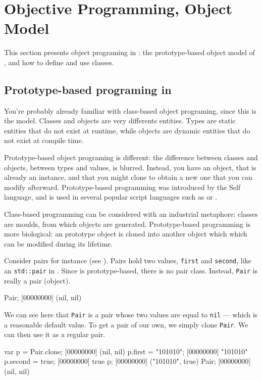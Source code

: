\chapter{Objective Programming, \us Object Model}
\label{sec:tut:object}

This section presents object programing in \us: the prototype-based
object model of \us, and how to define and use classes.

\section{Prototype-based programing in \us}

You're probably already familiar with class-based object programing,
since this is the \Cxx model.  Classes and objects are very differents
entities.  Types are static entities that do not exist at runtime,
while objects are dynamic entities that do not exist at compile time.

Prototype-based object programing is different: the difference between
classes and objects, between types and values, is blurred. Instead,
you have an
object, that is already an instance, and that you might clone to
obtain a new one that you can modify afterward. Prototype-based
programming was introduced by the Self language, and is used in
several popular script languages such as \io or \js.

Class-based programming can be considered with an industrial
metaphore: classes are moulds, from which objects are generated.
Prototype-based programming is more biological: an prototype object is
cloned into another object which which can be modified during its
lifetime.

Consider pairs for instance (see ). Pairs hold two
values, \lstinline|first| and \lstinline|second|, like an
\lstinline{std::pair} in \Cxx. Since \us is prototype-based, there is
no pair class. Instead, \lstinline|Pair| is really a pair (object).

\begin{urbiscript}[firstnumber=1]
Pair;
[00000000] (nil, nil)
\end{urbiscript}

We can see here that \lstinline|Pair| is a pair whose two values are
equal to \lstinline|nil| --- which is a reasonable default value. To
get a pair of our own, we simply clone \lstinline|Pair|.  We can then
use it as a regular pair.

\begin{urbiscript}[firstnumber=last]
var p = Pair.clone;
[00000000] (nil, nil)
p.first = "101010";
[00000000] "101010"
p.second = true;
[00000000] true
p;
[00000000] ("101010", true)
Pair;
[00000000] (nil, nil)
\end{urbiscript}

